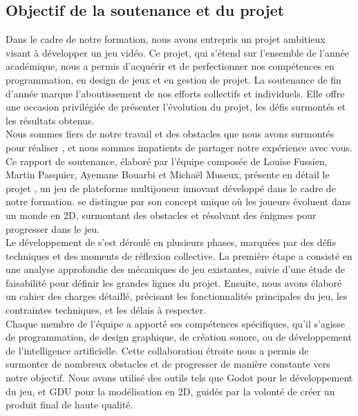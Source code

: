 

\subsection{Objectif de la soutenance et du projet}



Dans le cadre de notre formation, nous avons entrepris un projet ambitieux visant à développer un jeu vidéo.
Ce projet, qui s'étend sur l'ensemble de l'année académique, nous a permis d'acquérir et de perfectionner nos compétences en programmation,
en design de jeux et en gestion de projet. La soutenance de fin d'année marque l'aboutissement de nos efforts collectifs et individuels.
Elle offre une occasion privilégiée de présenter l'évolution du projet, les défis surmontés et les résultats obtenus.
\\

Nous sommes fiers de notre travail et des obstacles que nous avons surmontés pour réaliser \gameName,
et nous sommes impatients de partager notre expérience avec vous.
\\

Ce rapport de soutenance, élaboré par l'équipe composée de Louise Fussien, Martin Pasquier, Ayemane Bouarbi et Michaël Museux, présente
en détail le projet \gameName, un jeu de plateforme multijoueur innovant développé dans le cadre de notre formation. \gameName  se distingue par son concept unique
où les joueurs évoluent dans un monde en 2D, surmontant des obstacles et résolvant des énigmes pour progresser dans le jeu.
\\

Le développement de \gameName  s'est déroulé en plusieurs phases, marquées par des défis techniques et des moments de réflexion collective.
La première étape a consisté en une analyse approfondie des mécaniques de jeu existantes, suivie d'une étude de faisabilité pour définir les grandes lignes du projet.
Ensuite, nous avons élaboré un cahier des charges détaillé, précisant les fonctionnalités principales du jeu, les contraintes techniques, et les délais à respecter.
\\

Chaque membre de l'équipe a apporté ses compétences spécifiques, qu'il s'agisse de programmation, de design graphique, de création sonore, ou de développement de
l'intelligence artificielle. Cette collaboration étroite nous a permis de surmonter de nombreux obstacles et de progresser de manière constante vers notre objectif.
Nous avons utilisé des outils tels que Godot pour le développement du jeu, et GDU pour la modélisation en 2D, guidés par la volonté de créer un produit final de haute qualité.
\\

